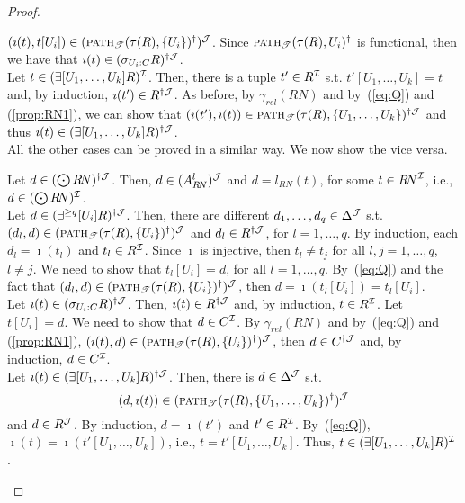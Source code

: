 \documentclass[envcountsame,draft]{llncs}
\newcommand{\lreif}[1]{\ensuremath{\bigodot#1}}
\newcommand{\pth}[2]{\ensuremath{\textsc{path}_{\mathscr{T}}(#1,#2)}\xspace}
\begin{document}
\begin{proof}
\begin{enumerate}
  $(\imath(t),t[U_i])\in(\pth{\tau(R)}{\{U_i\}}^\dag)^\Jmc$.
   Since $\pth{\tau(R)}{U_i}^\dag$ is functional, then we have that
  $\imath(t)\in (\sigma_{U_i : C} R)^{\dag \mathcal{J}}$.\\
%
  Let $t\in(\exists[U_1,\ldots,U_k] R)^{\mathcal{I}}$. Then, there is a tuple
  $t'\in R^\mathcal{I}$ s.t. $t'[U_1,\ldots,U_k]=t$ and, by induction,
  $\imath(t')\in R^{\dag\mathcal{J}}$. As before, by
  $\gamma_{\textit{rel}}(R\!N)$ and by~(\ref{eq:Q}) and
  (\ref{prop:RN1}), we can show that
  $(\imath(t'),\imath(t))\in
  \pth{\tau(R)}{\{U_1,\ldots,U_k\}}^{\dag\Jmc}$ and thus
  $\imath(t)\in(\exists[U_1,\ldots,U_k] R)^{\dag\mathcal{J}}$.\\
%
  All the other cases can be proved in a similar way. We now show the
  vice versa.

  \smallskip

  Let $d\in(\lreif R\!N)^{\dag\Jmc}$. Then, $d\in (A_{R\!N}^l)^\mathcal{J}$
  and $d=l_{R\!N}(t)$, for some $t\in
  {R\!N}^\mathcal{I}$, i.e., $d\in(\lreif R\!N)^\Imc$.\\
%
  Let $d\in(\exists^{\geq q}[{U_i}] R)^{\dag \mathcal{J}}$. Then, there are
  different  $d_1,\ldots,d_q\in\Delta^\mathcal{J}$ s.t.
  $(d_l,d)\in (\pth{\tau(R)}{\{U_i\}}^\dag)^{\Jmc}$ and
  $d_l\in R^{\dag \mathcal{J}}$, for $l=1,\ldots,q$. By induction, each
  $d_l=\imath(t_l)$ and $t_l\in R^\mathcal{I}$. Since $\imath$ is injective,
  then $t_l\neq t_j$ for all $l,j=1,\ldots,q$, $l\neq j$. We need to
  show that $t_l[U_i] = d$, for all $l=1,\ldots,q$. By~(\ref{eq:Q})
  and the fact that $(d_l,d)\in (\pth{\tau(R)}{\{U_i\}}^\dag)^{\Jmc}$,
  then $d=\imath(t_l[U_i])=t_l[U_i]$.\\
%
  Let $\imath(t)\in(\sigma_{U_i : C} R)^{\dag\mathcal{J}}$.  Then,
  $\imath(t)\in R^{\dag \mathcal{J}}$ and, by induction, $t\in R^\mathcal{I}$. Let
  $t[U_i]=d$. We need to show that $d\in C^\mathcal{I}$. By
  $\gamma_{\textit{rel}}(R\!N)$ and by~(\ref{eq:Q}) and
  (\ref{prop:RN1}),
  $(\imath(t),d)\in (\pth{\tau(R)}{\{U_i\}}^\dag)^\Jmc$, then
  $d\in C ^{\dag\mathcal{J}}$ and, by induction, $d\in C ^{\mathcal{I}}$.\\
%
  Let $\imath(t)\in(\exists[U_1,\ldots,U_k] R)^{\dag\mathcal{J}}$. Then, there is
  $d\in\Delta^\mathcal{J}$ s.t.
  $$(d,\imath(t)) \in (\pth{\tau(R)}{\{U_1,\ldots,U_k\}}^\dag)^\Jmc$$ and
  $d\in R^\mathcal{J}$.  By induction, $d=\imath(t')$ and
  $t'\in R^\mathcal{I}$. By~(\ref{eq:Q}), $\imath(t)=
  \imath(t'[U_1,\ldots,U_k])$, i.e., $t=t'[U_1,\ldots,U_k]$. Thus,
  $t\in(\exists[U_1,\ldots,U_k] R)^{\mathcal{I}}$.


\end{enumerate}
\end{proof}
\end{document}
